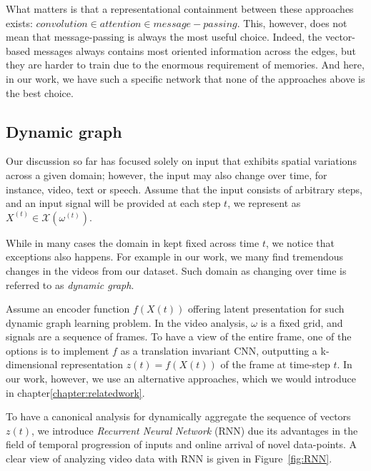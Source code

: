     What matters is that a representational containment between these approaches exists: $convolution \in attention \in message-passing $. This, however, does not mean that message-passing is always the most useful choice. Indeed, the vector-based messages always contains most oriented information across the edges, but they are harder to train due to the enormous requirement of memories. And here, in our work, we have such a specific network that none of the approaches above is the best choice.
 

    \subsection{Dynamic graph}
    Our discussion so far has focused solely on input that exhibits spatial variations across a given domain; however, the input may also change over time, for instance, video, text or speech.
    Assume that the input consists of arbitrary steps, and an input signal will be provided at each step $t$, we represent as $X^{(t)}\in \mathcal{X} (\omega^{(t)})$.

    While in many cases the domain in kept fixed across time $t$, we notice that exceptions also happens. For example in our work, we many find tremendous changes in the videos from our dataset. Such domain as changing over time is referred to as \textit{dynamic graph}\cite{rossi2006temporal,xu2020inductive}.

    Assume an encoder function $f(X(t))$ offering latent presentation for such dynamic graph learning problem. In the video analysis, $\omega$ is a fixed grid, and signals are a sequence of frames. To have a view of the entire frame, one of the options is to implement $f$ as a translation invariant CNN, outputting a k-dimensional representation $z(t)=f(X(t))$  of the frame at time-step $t$. In our work, however, we use an alternative approaches, which we would introduce in chapter\ref{chapter:relatedwork}.

    To have a canonical analysis for dynamically aggregate the sequence of vectors $z(t)$, we introduce \textit{Recurrent Neural Network} (RNN)\cite{schmidt2019recurrent} due its advantages in the field of temporal progression of inputs and online arrival of novel data-points. A clear view of analyzing video data with RNN is given in Figure~\ref{fig:RNN}.

